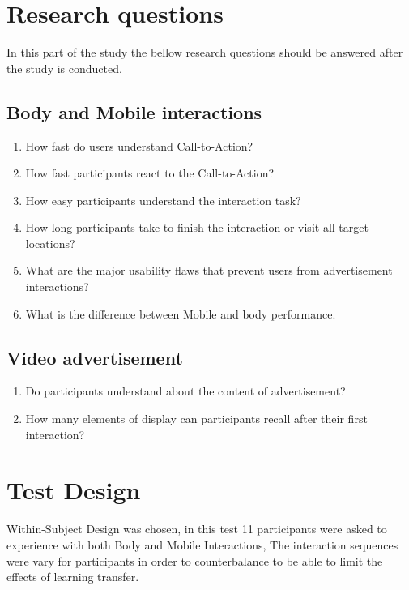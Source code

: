 \section{Research questions}

In this part of the study the bellow research questions should be answered after the study is conducted. 

\subsection{Body and Mobile interactions}
\begin{enumerate}
\item	How fast do users understand Call-to-Action?
\item	How fast participants react to the Call-to-Action?
\item	How easy participants understand the interaction task?
\item	How long participants take to finish the interaction or visit all target locations?
\item	What are the major usability flaws that prevent users from advertisement interactions?
\item	What is the difference between Mobile and body performance.
\end{enumerate}

\subsection{Video advertisement}
\begin{enumerate}
\item	Do participants understand about the content of advertisement?
\item	How many elements of display can participants recall after their first interaction?
\end{enumerate}


\section{Test Design}
Within-Subject Design was chosen, in this test 11 participants were asked to experience with both Body and Mobile Interactions, The interaction sequences were vary for participants in order to counterbalance to be able to limit the effects of learning transfer. 


